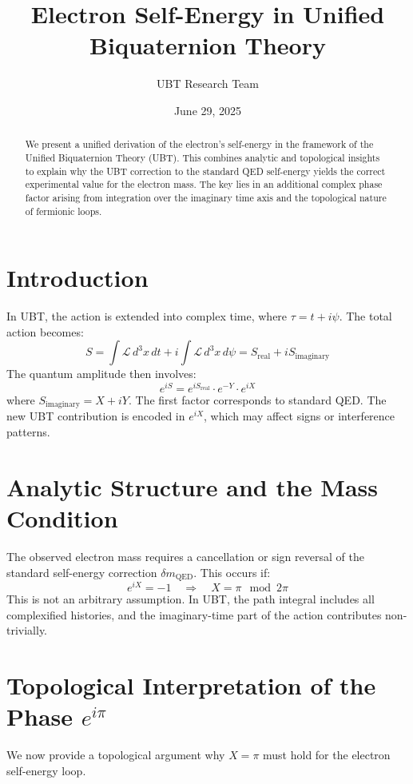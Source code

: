 \documentclass[12pt, a4paper]{article}
\title{\textbf{Electron Self-Energy in Unified Biquaternion Theory}}
\author{UBT Research Team}
\date{June 29, 2025}
\begin{document}
\maketitle

\begin{abstract}
We present a unified derivation of the electron's self-energy in the framework of the Unified Biquaternion Theory (UBT). This combines analytic and topological insights to explain why the UBT correction to the standard QED self-energy yields the correct experimental value for the electron mass. The key lies in an additional complex phase factor arising from integration over the imaginary time axis and the topological nature of fermionic loops.
\end{abstract}

\section{Introduction}

In UBT, the action is extended into complex time, where \( \tau = t + i\psi \). The total action becomes:
\[
S = \int \mathcal{L} \, d^3x\,dt + i \int \mathcal{L} \, d^3x\,d\psi = S_{\text{real}} + i S_{\text{imaginary}}
\]
The quantum amplitude then involves:
\[
e^{iS} = e^{iS_{\text{real}}} \cdot e^{-Y} \cdot e^{iX}
\]
where \( S_{\text{imaginary}} = X + iY \). The first factor corresponds to standard QED. The new UBT contribution is encoded in \( e^{iX} \), which may affect signs or interference patterns.

\section{Analytic Structure and the Mass Condition}

The observed electron mass requires a cancellation or sign reversal of the standard self-energy correction \( \delta m_{\text{QED}} \). This occurs if:
\[
e^{iX} = -1 \quad \Rightarrow \quad X = \pi \mod 2\pi
\]
This is not an arbitrary assumption. In UBT, the path integral includes all complexified histories, and the imaginary-time part of the action contributes non-trivially.

\section{Topological Interpretation of the Phase \( e^{i\pi} \)}

We now provide a topological argument why \( X = \pi \) must hold for the electron self-energy loop.
\end{document}
